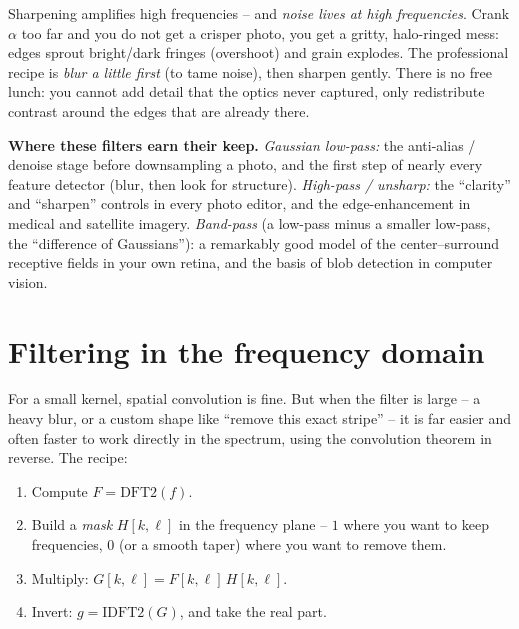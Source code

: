 \begin{trapbox}
Sharpening amplifies high frequencies -- and \emph{noise lives at high
frequencies}. Crank $\alpha$ too far and you do not get a crisper photo, you get a
gritty, halo-ringed mess: edges sprout bright/dark fringes (overshoot) and grain
explodes. The professional recipe is \emph{blur a little first} (to tame noise),
then sharpen gently. There is no free lunch: you cannot add detail that the optics
never captured, only redistribute contrast around the edges that are already there.
\end{trapbox}

\begin{applicationbox}
\textbf{Where these filters earn their keep.}
\emph{Gaussian low-pass:} the anti-alias / denoise stage before downsampling a
photo, and the first step of nearly every feature detector (blur, then look for
structure). \emph{High-pass / unsharp:} the ``clarity'' and ``sharpen'' controls
in every photo editor, and the edge-enhancement in medical and satellite imagery.
\emph{Band-pass} (a low-pass minus a smaller low-pass, the ``difference of
Gaussians''): a remarkably good model of the center--surround receptive fields in
your own retina, and the basis of blob detection in computer vision.
\end{applicationbox}

\section{Filtering in the frequency domain}
\label{ch31:freq-filtering}

For a small kernel, spatial convolution is fine. But when the filter is large -- a
heavy blur, or a custom shape like ``remove this exact stripe'' -- it is far easier
and often faster to work directly in the spectrum, using the convolution theorem
in reverse. The recipe:

\begin{enumerate}
\item Compute $F = \mathrm{DFT2}(f)$.
\item Build a \emph{mask} $H[k,\ell]$ in the frequency plane -- $1$ where you want to
keep frequencies, $0$ (or a smooth taper) where you want to remove them.
\item Multiply: $G[k,\ell] = F[k,\ell]\,H[k,\ell]$.
\item Invert: $g = \mathrm{IDFT2}(G)$, and take the real part.
\end{enumerate}

